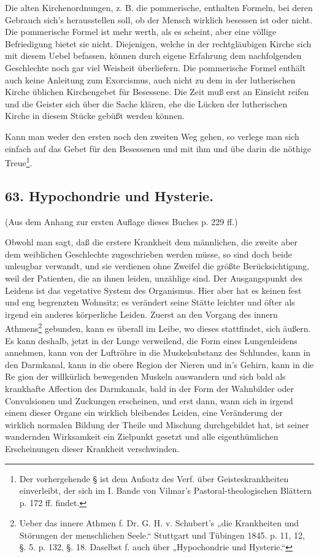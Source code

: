 Die alten Kirchenordnungen, z. B. die pommerische, enthalten Formeln, bei deren Gebrauch sich’s herausstellen soll, ob der Mensch wirklich besessen ist oder nicht. Die pommerische Formel ist mehr werth, als es scheint, aber eine völlige Befriedigung bietet sie nicht. Diejenigen, welche in der rechtgläubigen Kirche sich mit diesem Uebel befassen, können durch eigene Erfahrung dem nachfolgenden Geschlechte noch gar viel Weisheit überliefern. Die pommerische Formel enthält auch keine Anleitung zum Exorcismus, auch nicht zu dem in der lutherischen Kirche üblichen Kirchengebet für Besessene. Die Zeit muß erst an Einsicht reifen und die Geister sich über die Sache klären, ehe die Lücken der lutherischen Kirche in diesem Stücke gebüßt werden können.

Kann man weder den ersten noch den zweiten Weg gehen, so verlege man sich einfach auf das Gebet für den Besessenen und mit ihm und übe darin die nöthige Treue\footnote{Der vorhergehende § ist dem Aufsatz des Verf. über Geisteskrankheiten einverleibt, der sich im I. Bande von Vilmar’s Pastoral-theologischen Blättern p. 172 ff. findet.}.

\subsection*{63. Hypochondrie und Hysterie.}

\begin{center}
(Aus dem Anhang zur ersten Auflage dieses Buches p. 229 ff.)
\end{center}

Obwohl man sagt, daß die erstere Krankheit dem männlichen, die zweite aber dem weiblichen Geschlechte zugeschrieben werden müsse, so sind doch beide unleugbar verwandt, und sie verdienen ohne Zweifel die größte Berücksichtigung, weil der Patienten, die an ihnen leiden, unzählige sind. Der Ausgangspunkt des Leidens ist das vegetative System des Organismus. Hier aber hat es keinen fest und eng begrenzten Wohnsitz; es verändert seine Stätte leichter und öfter als irgend ein anderes körperliche Leiden. Zuerst an den Vorgang des innern Athmens\footnote{Ueber das innere Athmen f. Dr. G. H. v. Schubert’s „die Krankheiten und Störungen der menschlichen Seele.“ Stuttgart und Tübingen 1845. p. 11, 12, §. 5. p. 132, §. 18. Daselbst f. auch über „Hypochondrie und Hysterie.“} gebunden, kann es überall im Leibe, wo dieses stattfindet, sich äußern. Es kann deshalb, jetzt in der Lunge verweilend, die Form eines Lungenleidens annehmen, kann von der Luftröhre in die Muskelsubstanz des Schlundes, kann in den Darmkanal, kann in die obere Region der Nieren und in’s Gehirn, kann in die Re%
gion der willkürlich bewegenden Muskeln auswandern und sich bald als krankhafte Affection des Darmkanals, bald in der Form der Wahnbilder oder Convulsionen und Zuckungen erscheinen, und erst dann, wann sich in irgend einem dieser Organe ein wirklich bleibendes Leiden, eine Veränderung der wirklich normalen Bildung der Theile und Mischung durchgebildet hat, ist seiner wandernden Wirksamkeit ein Zielpunkt gesetzt und alle eigenthümlichen Erscheinungen dieser Krankheit verschwinden.

